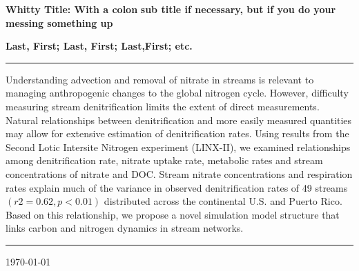 \documentclass[10pt,letterpaper]{article}
\begin{document}
\begin{flushleft}
\textbf{Whitty Title: With a colon}
\newline
\small{\textbf{sub title if necessary, but if you do your messing something up}}
\vspace{1em}

\textbf{Last, First; Last, First; Last,First; etc.}
\rule{\textwidth}{1pt}
\vspace{2em}

\onehalfspacing %

Understanding advection and removal of nitrate in streams is relevant to managing anthropogenic changes to the global nitrogen cycle. However, difficulty measuring stream denitrification limits the extent of direct measurements.  Natural relationships between denitrification and more easily measured quantities may allow for extensive estimation of denitrification rates. Using results from the Second Lotic Intersite Nitrogen experiment (LINX-II), we examined relationships among denitrification rate, nitrate uptake rate, metabolic rates and stream concentrations of nitrate and DOC. Stream nitrate concentrations and respiration rates explain much of the variance in observed denitrification rates of 49 streams $(r2 = 0.62, p<0.01)$ distributed across the continental U.S. and Puerto Rico. Based on this relationship, we propose a novel simulation model structure that links carbon and nitrogen dynamics in stream networks. 
\vspace{2em}
\rule{\textwidth}{1pt}
\today
\end{flushleft}
\end{document}
